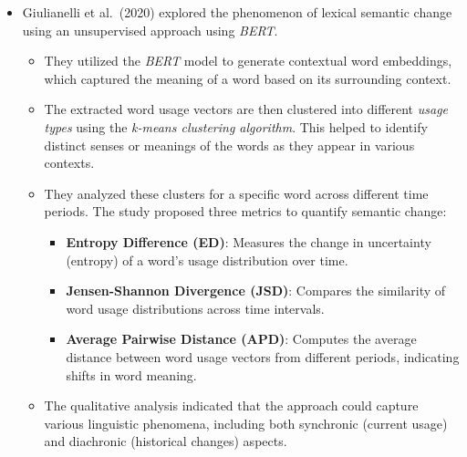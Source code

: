 \begin{itemize}
    \item {}
        Giulianelli et al.\ (2020) explored the phenomenon of lexical semantic change using an unsupervised approach using \emph{BERT}.
        \begin{itemize}
            \item They utilized the \emph{BERT} model to generate contextual word embeddings, which captured the meaning of a word based on its surrounding context.
            \item The extracted word usage vectors are then clustered into different \emph{usage types} using the \emph{k-means clustering algorithm}.
            This helped to identify distinct senses or meanings of the words as they appear in various contexts.
            \item They analyzed these clusters for a specific word across different time periods.
            The study proposed three metrics to quantify semantic change:
            \begin{itemize}
                \item \textbf{Entropy Difference (ED)}: Measures the change in uncertainty (entropy) of a word’s usage distribution over time.
                \item \textbf{Jensen-Shannon Divergence (JSD)}: Compares the similarity of word usage distributions across time intervals.
                \item \textbf{Average Pairwise Distance (APD)}: Computes the average distance between word usage vectors from different periods, indicating shifts in word meaning.
            \end{itemize}
            \item The qualitative analysis indicated that the approach could capture various linguistic phenomena, including both synchronic (current usage) and diachronic (historical changes) aspects.
        \end{itemize}


\end{itemize}

